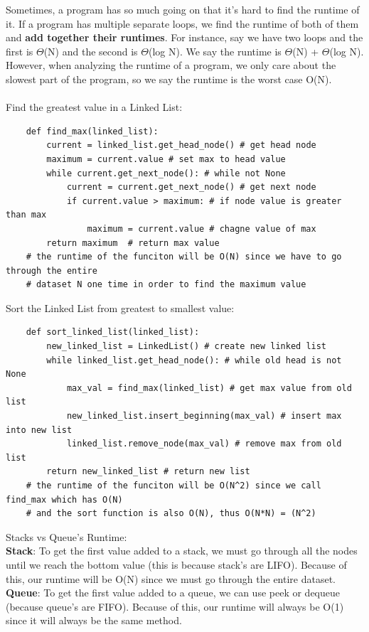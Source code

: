 \documentclass[11pt, a4paper]{article}
\begin{document}
\begin{spacing}{1.1}
	Sometimes, a program has so much going on that it’s hard to find the runtime of it. If a program has multiple separate loops, we find the runtime of both of them and \textbf{add together their runtimes}. For instance, say we have two loops and the first is $\Theta$(N) and the second is $\Theta$(log N). We say the runtime is $\Theta$(N) + $\Theta$(log N). However, when analyzing the runtime of a program, we only care about the slowest part of the program, so we say the runtime is the worst case O(N). \\~\\
	Find the greatest value in a Linked List:
	\begin{lstlisting} 
	def find_max(linked_list):
		current = linked_list.get_head_node() # get head node
		maximum = current.value # set max to head value
		while current.get_next_node(): # while not None
			current = current.get_next_node() # get next node
			if current.value > maximum: # if node value is greater than max
				maximum = current.value # chagne value of max
		return maximum  # return max value	
	# the runtime of the funciton will be O(N) since we have to go through the entire
	# dataset N one time in order to find the maximum value \end{lstlisting} \vspace*{2mm}
	Sort the Linked List from greatest to smallest value:	
	\begin{lstlisting}
	def sort_linked_list(linked_list):
		new_linked_list = LinkedList() # create new linked list
		while linked_list.get_head_node(): # while old head is not None
			max_val = find_max(linked_list) # get max value from old list
			new_linked_list.insert_beginning(max_val) # insert max into new list
			linked_list.remove_node(max_val) # remove max from old list
		return new_linked_list # return new list
	# the runtime of the funciton will be O(N^2) since we call find_max which has O(N)
	# and the sort function is also O(N), thus O(N*N) = (N^2) \end{lstlisting} \vspace*{2mm}
	Stacks vs Queue's Runtime: \vspace*{1mm} \\
	\textbf{Stack}: To get the first value added to a stack, we must go through all the nodes until we reach the bottom value (this is because stack's are LIFO). Because of this, our runtime will be O(N) since we must go through the entire dataset. \vspace*{1mm} \\
	\textbf{Queue}: To get the first value added to a queue, we can use peek or dequeue (because queue's are FIFO). Because of this, our runtime will always be O(1) since it will always be the same method. \\~\\

\end{spacing}
\end{document}

